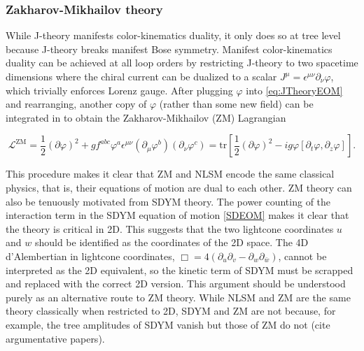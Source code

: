 \documentclass[11pt,letter]{article}
\def\be{\begin{equation}}
\def\ee{\end{equation}}
\begin{document}
\subsubsection{Zakharov-Mikhailov theory}
\label{sec:ZMTheory}
While J-theory manifests color-kinematics duality, it only does so at tree level because J-theory breaks manifest Bose symmetry.
Manifest color-kinematics duality can be achieved at all loop orders by restricting J-theory to two spacetime dimensions where the chiral current can be dualized to a scalar $J^\mu = \epsilon^{\mu\nu} \partial_\nu \varphi$, which trivially enforces Lorenz gauge.
After plugging $\varphi$ into \eqref{eq:JTheoryEOM} and rearranging, another copy of $\varphi$ (rather than some new field) can be integrated in to obtain the Zakharov-Mikhailov (ZM) Lagrangian
\begin{eBox}
\be
\label{eq:ZMLagrangian}
\mathcal{L}^{\text{ZM}} = \frac{1}{2}(\partial \varphi)^2 + g f^{abc} \varphi^a \epsilon^{\mu\nu}(\partial_\mu \varphi^b)( \partial_\nu \varphi^c) =  \text{tr}\left[\frac{1}{2}(\partial \varphi)^2-i g \varphi [\partial_t \varphi, \partial_z \varphi ]\right] .
\ee
\end{eBox}
This procedure makes it clear that ZM and NLSM encode the same classical physics, that is, their equations of motion are dual to each other.
ZM theory can also be tenuously motivated from SDYM theory.
The power counting of the interaction term in the SDYM equation of motion \eqref{SDEOM} makes it clear that the theory is critical in 2D.
This suggests that the two lightcone coordinates $u$ and $w$ should be identified as the coordinates of the 2D space.
The 4D d'Alembertian in lightcone coordinates, $\Box = 4 (\partial_u \partial_v - \partial_w \partial_{\bar{w}})$, cannot be interpreted as the 2D equivalent, so the kinetic term of SDYM must be scrapped and replaced with the correct 2D version.
This argument should be understood purely as an alternative route to ZM theory.
While NLSM and ZM are the same theory classically when restricted to 2D, SDYM and ZM are not because, for example, the tree amplitudes of SDYM vanish but those of ZM do not (cite argumentative papers).
\end{document}
